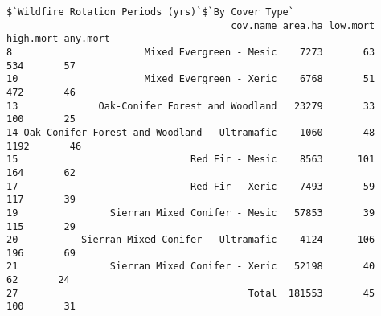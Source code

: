 \begin{verbatim}
$`Wildfire Rotation Periods (yrs)`$`By Cover Type`
                                       cov.name area.ha low.mort high.mort any.mort
8                       Mixed Evergreen - Mesic    7273       63       534       57
10                      Mixed Evergreen - Xeric    6768       51       472       46
13              Oak-Conifer Forest and Woodland   23279       33       100       25
14 Oak-Conifer Forest and Woodland - Ultramafic    1060       48      1192       46
15                              Red Fir - Mesic    8563      101       164       62
17                              Red Fir - Xeric    7493       59       117       39
19                Sierran Mixed Conifer - Mesic   57853       39       115       29
20           Sierran Mixed Conifer - Ultramafic    4124      106       196       69
21                Sierran Mixed Conifer - Xeric   52198       40        62       24
27                                        Total  181553       45       100       31
\end{verbatim}
